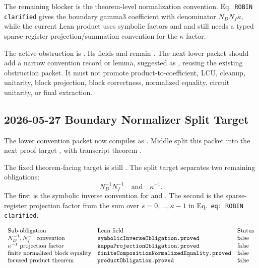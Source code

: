 The remaining blocker is the theorem-level normalization convention.
Eq.~\texttt{ROBIN clarified} gives the boundary gamma3 coefficient with
denominator \(N_DN_f\kappa\), while the current Lean product uses symbolic
factors  and  and still needs a typed
sparse-register projection/summation convention for the \(\kappa\) factor.

The active obstruction is
.  Its
fields  and
 remain .  The
next lower packet should add a narrow convention record or lemma, suggested as
, reusing
the existing obstruction packet.  It must not promote product-to-coefficient,
LCU, cleanup, unitarity, block projection, block correctness, normalized
equality, circuit unitarity, or final extraction.

\subsection{2026-05-27 Boundary Normalizer Split Target}

The lower convention packet now compiles as
.  Middle
split this packet into the next proof target
, with transcript
theorem
.

The fixed theorem-facing target is still
.  The split
target separates two remaining obligations:
\[
  N_D^{-1}N_f^{-1}
  \quad\text{and}\quad
  \kappa^{-1}.
\]
The first is the symbolic inverse convention for  and
.  The second is the sparse-register projection factor from
the sum over \(s=0,\dots,\kappa-1\) in Eq.~\texttt{eq: ROBIN clarified}.

\[
\begin{array}{lll}
\text{Sub-obligation} & \text{Lean field} & \text{Status}\\
N_D^{-1},N_f^{-1}\text{ convention} &
\texttt{symbolicInverseObligation.proved} & \text{false}\\
\kappa^{-1}\text{ projection factor} &
\texttt{kappaProjectionObligation.proved} & \text{false}\\
\text{finite normalized block equality} &
\texttt{finiteCompositionNormalizedEquality.proved} & \text{false}\\
\text{focused product theorem} &
\texttt{productObligation.proved} & \text{false}
\end{array}
\]

